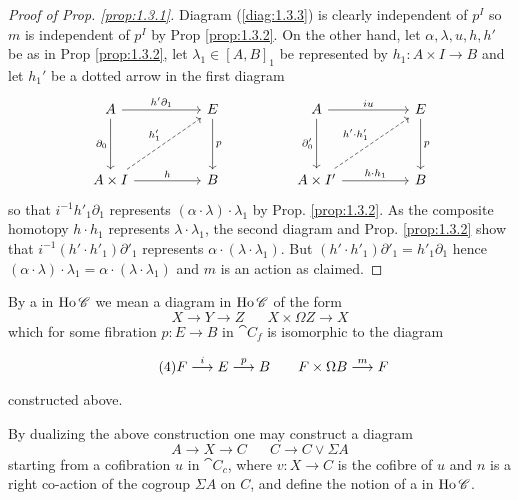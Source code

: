 \documentclass[../main]{subfiles}
\begin{document}
\begin{proof}[Proof of Prop. \ref{prop:1.3.1}]  Diagram (\ref{diag:1.3.3}) is clearly independent of $p^I$ so $m$ is independent of $p^I$ by Prop \ref{prop:1.3.2}.  On the other hand, let $\alpha, \lambda, u, h, h'$ be as in Prop \ref{prop:1.3.2}, let $\lambda_1 \in [A,B]_1$ be represented by $h_1:A\times I \longrightarrow B$ and let $h_1'$ be a dotted arrow in the first diagram
\[
\begin{tikzcd}
    A \arrow[rr, "h'\partial_1"] \arrow[dd, swap, "\partial_0"]
        && E \arrow[dd,"p"]
            && A \arrow[dd, swap, "\partial'_0"] \arrow[rr,"iu"]
                && E \arrow[dd,"p"] \\ \\
    A \times I \arrow[rruu, dashed, "h'_1"] \arrow[rr,"h"]
        && B
            && A \times I' \arrow[rruu, dashed, "h'\cdot h'_1"] \arrow[rr, "h \cdot h_1"]
                 && B
\end{tikzcd}
\]
so that $i^{-1}h'_1\partial_1$ represents $(\alpha \cdot \lambda) \cdot \lambda_1$ by Prop. \ref{prop:1.3.2}.  As the composite homotopy $h \cdot h_1$ represents $\lambda \cdot \lambda_1$, the second diagram and Prop. \ref{prop:1.3.2} show that $i^{-1}(h' \cdot h'_1)\partial'_1$ represents $\alpha \cdot (\lambda \cdot \lambda_1)$.  But $(h' \cdot h'_1) \partial'_1 = h'_1\partial_1$ hence $(\alpha \cdot \lambda) \cdot \lambda_1 = \alpha \cdot (\lambda \cdot \lambda_1)$ and $m$ is an action as claimed.

\end{proof}

\begin{definition}
    By a  in $\operatorname{Ho}\mathscr{C}$ we mean a diagram in $\operatorname{Ho}\mathscr{C}$ of the form \[  X \longrightarrow Y \longrightarrow Z \hspace{20pt} X \times \Omega Z \longrightarrow X  \] which for some fibration $p:E \longrightarrow B$ in $\cat{C}_f$ is isomorphic to the diagram

\[\tag{4}\label{eq:1.3.4}  F \varrightarrow{i} E \varrightarrow{p} B \hspace{20pt} F \times \Omega B \varrightarrow{m} F\] constructed above.

\end{definition}

\begin{remark}
    By dualizing the above construction one may construct a diagram \[A \longrightarrow X \longrightarrow C \hspace{20pt} C \longrightarrow C \vee \Sigma A\] starting from a cofibration $u$ in $\cat{C}_c$, where $v:X \longrightarrow C$ is the cofibre of $u$ and $n$ is a right co-action of the cogroup $\Sigma A$ on $C$, and define the notion of a  in $\operatorname{Ho}\mathscr{C}$.
\end{remark}
\end{document}
